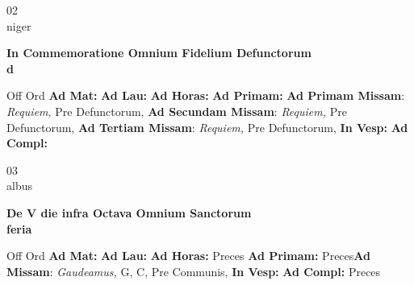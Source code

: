 \documentclass[10pt, openany]{book}
\begin{document}
    \begin{center}
        \begin{minipage}{3.5in}
            \vspace{2em}
            \begin{minipage}{0.5in}
                {\Huge 02} \\
                {\normalsize niger}
            \end{minipage}
            \begin{minipage}{3.0in}
                \textbf{ \large In Commemoratione Omnium Fidelium Defunctorum \\
                \textnormal{\normalsize d}}

            \end{minipage}
            \begin{justify}Off Ord
                \textbf{Ad Mat: }
                \textbf{Ad Lau: }
                \textbf{Ad Horas: }
                \textbf{Ad Primam: }\textbf{Ad Primam Missam}: \textit{Requiem,} Pre Defunctorum, \textbf{Ad Secundam Missam}: \textit{Requiem,} Pre Defunctorum, \textbf{Ad Tertiam Missam}: \textit{Requiem,} Pre Defunctorum, 
                \textbf{In Vesp: }
                \textbf{Ad Compl: }
            \end{justify}
        \end{minipage}
    \end{center}

    \begin{center}
        \begin{minipage}{3.5in}
            \vspace{2em}
            \begin{minipage}{0.5in}
                {\Huge 03} \\
                {\normalsize albus}
            \end{minipage}
            \begin{minipage}{3.0in}
                \textbf{ \large De V die infra Octava Omnium Sanctorum \\
                \textnormal{\normalsize feria}}

            \end{minipage}
            \begin{justify}Off Ord
                \textbf{Ad Mat: }
                \textbf{Ad Lau: }
                \textbf{Ad Horas: }Preces
                \textbf{Ad Primam: }Preces\textbf{Ad Missam}: \textit{Gaudeamus,} G, C, Pre Communis, 
                \textbf{In Vesp: }
                \textbf{Ad Compl: }Preces
            \end{justify}
        \end{minipage}
    \end{center}
\end{document}
